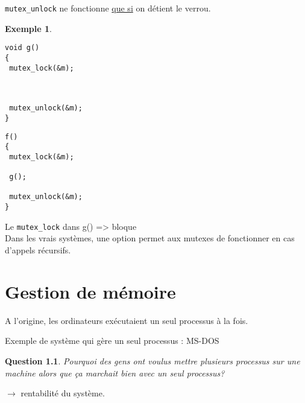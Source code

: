 \documentclass[12pt,a4paper]{report}
\newtheorem*{ex}{Exemple}
\newtheorem*{q}{Question}
\begin{document}
\verb?mutex_unlock? ne fonctionne \underline{que si} on détient le verrou.

\begin{ex} 
\end{ex}
\medskip
\begin{minipage}{0.5\linewidth}
\begin{verbatim}
void g()
{
 mutex_lock(&m);

 
 
 mutex_unlock(&m);
}
\end{verbatim}
\end{minipage}
\begin{minipage}{0.5\linewidth}
\begin{verbatim}
f()
{
 mutex_lock(&m);
 
 g();
 
 mutex_unlock(&m);
}
\end{verbatim}
\end{minipage}

\bigskip

Le \verb?mutex_lock? dans g() => bloque\\
Dans les vrais systèmes, une option permet aux mutexes de fonctionner en cas d'appels récursifs.\\


\chapter{Gestion de mémoire}

A l'origine, les ordinateurs exécutaient un seul processus à la fois.

\begin{center}
\end{center}
Exemple de système qui gère un seul processus : MS-DOS\\

\begin{q}Pourquoi des gens ont voulus mettre plusieurs processus sur une machine alors que ça marchait bien avec un seul processus?\end{q}
$\longrightarrow$ rentabilité du système.\\
\end{document}
